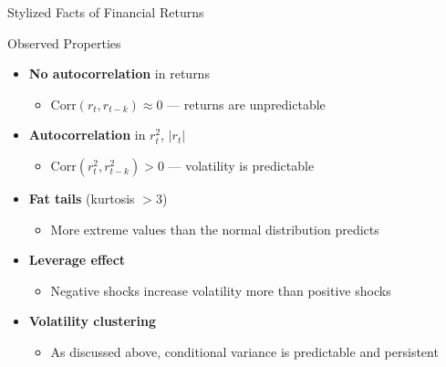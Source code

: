 \documentclass[9pt, aspectratio=169, t]{beamer}
\begin{document}
\begin{frame}{Stylized Facts of Financial Returns}
    \vspace{-0.2cm}
    {\scriptsize
    \begin{block}{Observed Properties}
            \begin{itemize}\setlength{\itemsep}{0pt}
                \item \textbf{No autocorrelation} in returns
                    \begin{itemize}\setlength{\itemsep}{0pt}
                        \item $\text{Corr}(r_t, r_{t-k}) \approx 0$ --- returns are unpredictable
                    \end{itemize}
                \item \textbf{Autocorrelation} in $r_t^2$, $|r_t|$
                    \begin{itemize}\setlength{\itemsep}{0pt}
                        \item $\text{Corr}(r_t^2, r_{t-k}^2) > 0$ --- volatility is predictable
                    \end{itemize}
                \item \textbf{Fat tails} (kurtosis $> 3$)
                    \begin{itemize}\setlength{\itemsep}{0pt}
                        \item More extreme values than the normal distribution predicts
                    \end{itemize}
                \item \textbf{Leverage effect}
                    \begin{itemize}\setlength{\itemsep}{0pt}
                        \item Negative shocks increase volatility more than positive shocks
                    \end{itemize}
                \item \textbf{Volatility clustering}
                    \begin{itemize}\setlength{\itemsep}{0pt}
                        \item As discussed above, conditional variance is predictable and persistent
                    \end{itemize}
            \end{itemize}
        \end{block}
    }
\end{frame}
\end{document}
